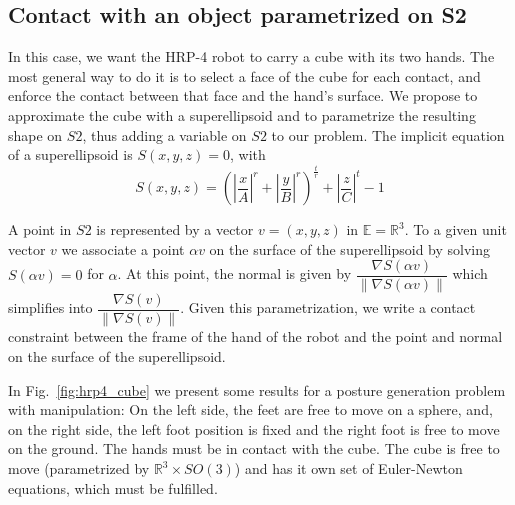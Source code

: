 \subsection{Contact with an object parametrized on S2}

In this case, we want the HRP-4 robot to carry a cube with its two hands.
The most general way to do it is to select a face of the cube for each contact, and enforce the contact between that face and the hand's surface.
We propose to approximate the cube with a superellipsoid and to parametrize the resulting shape on $S2$, thus adding a variable on $S2$ to our problem.
The implicit equation of a superellipsoid is $S(x,y,z) = 0$, with
\begin{equation}
  S(x,y,z) = {\left( \left|\frac{x}{A}\right|^r + \left|\frac{y}{B}\right|^r\right)}^\frac{t}{r} + \left|\frac{z}{C}\right|^t - 1
  \label{eq:super_ellipsoid}
\end{equation}

A point in $S2$ is represented by a vector $v=(x,y,z)$ in $\mathbb{E} = \mathbb{R}^3$.
To a given unit vector $v$ we associate a point $\alpha v$ on the surface of the superellipsoid by solving $S(\alpha v) = 0$ for $\alpha$.
At this point, the normal is given by $\dfrac{\nabla S(\alpha v)}{\left\|\nabla S(\alpha v)\right\|}$ which simplifies into $\dfrac{\nabla S(v)}{\left\|\nabla S(v)\right\|}$.
Given this parametrization, we write a contact constraint between the frame of the hand of the robot and the point and normal on the surface of the superellipsoid.

In Fig.~\ref{fig:hrp4_cube} we present some results for a posture generation problem with manipulation: On the left side, the feet are free to move on a sphere, and, on the right side, the left foot position is fixed and the right foot is free to move on the ground.
The hands must be in contact with the cube.
The cube is free to move (parametrized by $\mathbb{R}^3 \times SO(3)$) and has it own set of Euler-Newton equations, which must be fulfilled.

